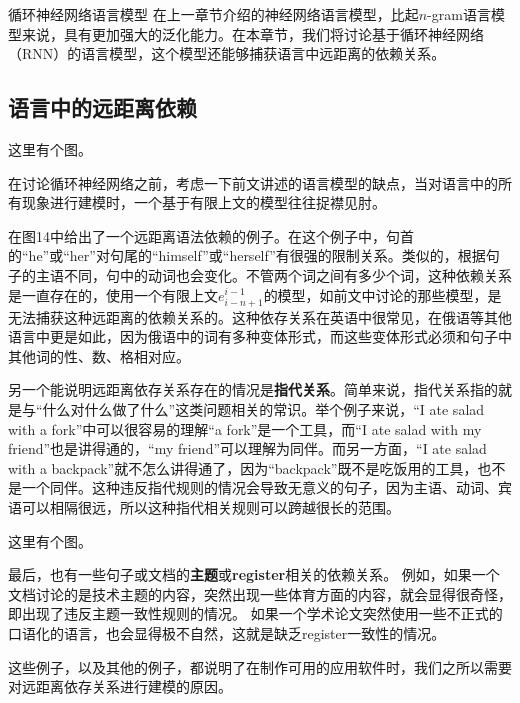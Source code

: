 \documentclass[10pt,a4paper]{ctexart}
\makeatletter
\renewcommand{\section}{\@startsection{section}{1}{0mm}
  {-\baselineskip}{0.5\baselineskip}{\bf\leftline}}
\makeatother
\begin{document}

\section{循环神经网络语言模型}
在上一章节介绍的神经网络语言模型，比起$n$-gram语言模型来说，具有更加强大的泛化能力。在本章节，我们将讨论基于循环神经网络（RNN）的语言模型，这个模型还能够捕获语言中远距离的依赖关系。

\subsection{语言中的远距离依赖}
这里有个图。

在讨论循环神经网络之前，考虑一下前文讲述的语言模型的缺点，当对语言中的所有现象进行建模时，一个基于有限上文的模型往往捉襟见肘。

在图14中给出了一个远距离语法依赖的例子。在这个例子中，句首的“he”或“her”对句尾的“himself”或“herself”有很强的限制关系。类似的，根据句子的主语不同，句中的动词也会变化。不管两个词之间有多少个词，这种依赖关系是一直存在的，使用一个有限上文$e_{i-n+1}^{i-1}$的模型，如前文中讨论的那些模型，是无法捕获这种远距离的依赖关系的。这种依存关系在英语中很常见，在俄语等其他语言中更是如此，因为俄语中的词有多种变体形式，而这些变体形式必须和句子中其他词的性、数、格相对应。

另一个能说明远距离依存关系存在的情况是\textbf{指代关系}。简单来说，指代关系指的就是与“什么对什么做了什么”这类问题相关的常识。举个例子来说，“I ate salad with a fork”中可以很容易的理解“a fork”是一个工具，而“I ate salad with my friend”也是讲得通的，“my friend”可以理解为同伴。而另一方面，“I ate salad with a backpack”就不怎么讲得通了，因为“backpack”既不是吃饭用的工具，也不是一个同伴。这种违反指代规则的情况会导致无意义的句子，因为主语、动词、宾语可以相隔很远，所以这种指代相关规则可以跨越很长的范围。

这里有个图。

最后，也有一些句子或文档的\textbf{主题}或\textbf{register}相关的依赖关系。
例如，如果一个文档讨论的是技术主题的内容，突然出现一些体育方面的内容，就会显得很奇怪，即出现了违反主题一致性规则的情况。
如果一个学术论文突然使用一些不正式的口语化的语言，也会显得极不自然，这就是缺乏register一致性的情况。

这些例子，以及其他的例子，都说明了在制作可用的应用软件时，我们之所以需要对远距离依存关系进行建模的原因。
\end{document}
